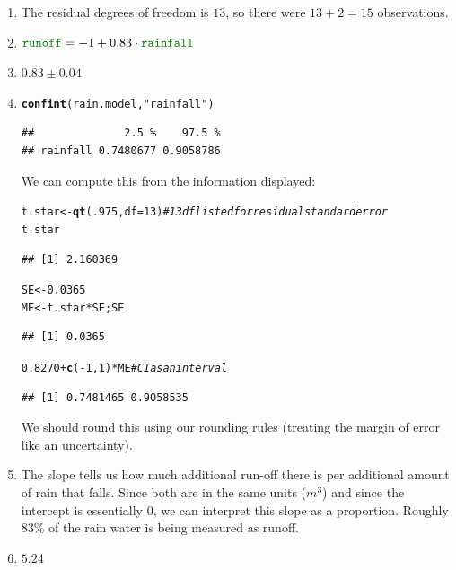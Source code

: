 \documentclass[twoside]{book}\usepackage[]{graphicx}\usepackage[]{xcolor}
\makeatletter
\newcommand{\hlnum}[1]{\textcolor[rgb]{0.686,0.059,0.569}{#1}}%
\newcommand{\hlstr}[1]{\textcolor[rgb]{0.192,0.494,0.8}{#1}}%
\newcommand{\hlcom}[1]{\textcolor[rgb]{0.678,0.584,0.686}{\textit{#1}}}%
\newcommand{\hlopt}[1]{\textcolor[rgb]{0,0,0}{#1}}%
\newcommand{\hlstd}[1]{\textcolor[rgb]{0.345,0.345,0.345}{#1}}%
\newcommand{\hlkwb}[1]{\textcolor[rgb]{0.69,0.353,0.396}{#1}}%
\newcommand{\hlkwc}[1]{\textcolor[rgb]{0.333,0.667,0.333}{#1}}%
\newcommand{\hlkwd}[1]{\textcolor[rgb]{0.737,0.353,0.396}{\textbf{#1}}}%
\newenvironment{kframe}{%
 \def\at@end@of@kframe{}%
 \ifinner\ifhmode%
  \def\at@end@of@kframe{\end{minipage}}%
  \begin{minipage}{\columnwidth}%
 \fi\fi%
 \def\FrameCommand##1{\hskip\@totalleftmargin \hskip-\fboxsep
 \colorbox{shadecolor}{##1}\hskip-\fboxsep
     \hskip-\linewidth \hskip-\@totalleftmargin \hskip\columnwidth}%
 \MakeFramed {\advance\hsize-\width
   \@totalleftmargin\z@ \linewidth\hsize
   \@setminipage}}%
 {\par\unskip\endMakeFramed%
 \at@end@of@kframe}
\newenvironment{knitrout}{}{} %
\newcommand{\variable}[1]{{\color{green!50!black}\texttt{#1}}}
\makeatother
\begin{document}
\begin{solution}
	\begin{enumerate}
		\item
			The residual degrees of freedom is $13$, so there were $13 + 2 = 15$
			observations.
\item
	$\variable{runoff} = -1  + 0.83 \cdot \variable{rainfall}$
\item
	$0.83 \pm 0.04$
\item
\begin{knitrout}
\color{fgcolor}\begin{kframe}
\begin{alltt}
\hlkwd{confint}\hlstd{( rain.model,} \hlstr{"rainfall"} \hlstd{)}
\end{alltt}
\begin{verbatim}
##              2.5 %    97.5 %
## rainfall 0.7480677 0.9058786
\end{verbatim}
\end{kframe}
\end{knitrout}
	We can compute this from the information displayed:
\begin{knitrout}
\color{fgcolor}\begin{kframe}
\begin{alltt}
\hlstd{t.star} \hlkwb{<-} \hlkwd{qt}\hlstd{(} \hlnum{.975}\hlstd{,} \hlkwc{df}\hlstd{=}\hlnum{13} \hlstd{)} \hlcom{# 13 df listed for residual standard error}
\hlstd{t.star}
\end{alltt}
\begin{verbatim}
## [1] 2.160369
\end{verbatim}
\begin{alltt}
\hlstd{SE} \hlkwb{<-} \hlnum{0.0365}
\hlstd{ME} \hlkwb{<-} \hlstd{t.star} \hlopt{*} \hlstd{SE; SE}
\end{alltt}
\begin{verbatim}
## [1] 0.0365
\end{verbatim}
\begin{alltt}
\hlnum{0.8270} \hlopt{+} \hlkwd{c}\hlstd{(}\hlopt{-}\hlnum{1}\hlstd{,}\hlnum{1}\hlstd{)} \hlopt{*} \hlstd{ME}  \hlcom{# CI as an interval}
\end{alltt}
\begin{verbatim}
## [1] 0.7481465 0.9058535
\end{verbatim}
\end{kframe}
\end{knitrout}
We should round this using our rounding rules (treating the margin of error
like an uncertainty).
\item
	The slope tells us how much additional run-off there is per additional
	amount of rain that falls.  Since both are in the same units ($m^3$) and
	since the intercept is essentially 0, we can interpret this slope as a
	proportion.  Roughly 83\% of the rain water is being measured as runoff. 
\item
	$5.24$
	\end{enumerate}
\end{solution}
\end{document}
